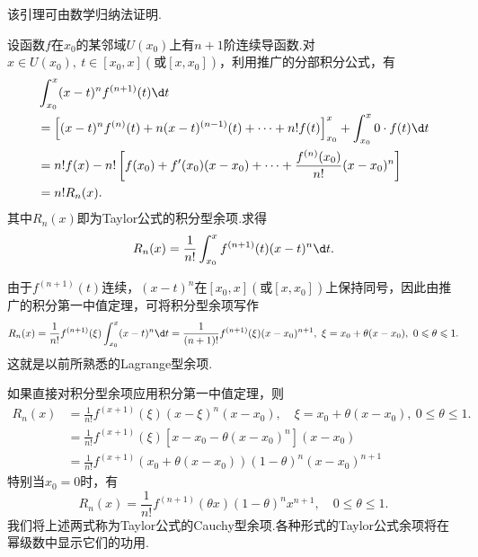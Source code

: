 该引理可由数学归纳法证明.

设函数$f$在$x_0$的某邻域$U(x_0)$上有$n+1$阶连续导函数.对$x\in U(x_0),\ t\in\left[x_0,x\right](\text{或}\left[x,x_0\right])$，利用推广的分部积分公式，有
\begin{align*}
	&\int_{x_0}^{x}(x-t)^nf^{(n+1)}(t)\d t\\
	&=\left[(x-t)^nf^{(n)}(t)+n(x-t)^{(n-1)}(t)+\cdots+n!f(t)\right]_{x_0}^{x}+\int_{x_0}^{x}0\cdot f(t)\d t\\
	&=n!f(x)-n!\left[f(x_0)+f'(x_0)(x-x_0)+\cdots+\frac{f^{(n)}(x_0)}{n!}(x-x_0)^n\right]\\
	&=n!R_n(x).
\end{align*}
其中$R_n(x)$即为Taylor公式的{\heiti 积分型余项}.求得
$$R_n(x)=\frac{1}{n!}\int_{x_0}^{x}f^{(n+1)}(t)(x-t)^n\d t.$$

由于$f^{(n+1)}(t)$连续，$(x-t)^n$在$\left[x_0,x\right](\text{或}\left[x,x_0\right])$上保持同号，因此由推广的积分第一中值定理，可将积分型余项写作
$$R_n(x)=\frac{1}{n!}f^{(n+1)}(\xi)\int_{x_0}^{x}(x-t)^n\d t=\frac{1}{(n+1)!}f^{(n+1)}(\xi)(x-x_0)^{n+1},\ \xi=x_0+\theta(x-x_0),\ 0\leqslant\theta\leqslant 1.$$
这就是以前所熟悉的Lagrange型余项.

\hspace*{\fill}

如果直接对积分型余项应用积分第一中值定理，则
\begin{align*}
	R_n(x)
	&=\frac{1}{n!}f^{(x+1)}(\xi)(x-\xi)^n(x-x_0),\quad \xi=x_0+\theta(x-x_0),\ 0\leqslant\theta\leqslant 1.\\
	&=\frac{1}{n!}f^{(x+1)}(\xi)\left[x-x_0-\theta(x-x_0)^n\right](x-x_0)\\
	&=\frac{1}{n!}f^{(x+1)}(x_0+\theta(x-x_0))(1-\theta)^n(x-x_0)^{n+1}
\end{align*}
特别当$x_0=0$时，有
$$R_n(x)=\frac{1}{n!}f^{(n+1)}(\theta x)(1-\theta)^nx^{n+1},\quad 0\leqslant\theta\leqslant 1.$$
我们将上述两式称为Taylor公式的{\heiti Cauchy型余项}.各种形式的Taylor公式余项将在幂级数中显示它们的功用.